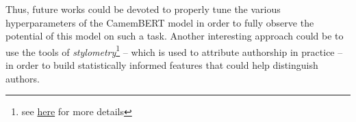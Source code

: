 \documentclass[11pt,a4paper]{article}
\begin{document}
Thus, future works could be devoted to properly tune the various hyperparameters of the CamemBERT model in order to fully observe the potential of this model on such a task. Another interesting approach could be to use the tools of \textit{stylometry}\footnote{see \href{https://en.wikipedia.org/wiki/Stylometry}{here} for more details} -- which is used to attribute authorship in practice -- in order to build statistically informed features that could help distinguish authors.







\newpage



\end{document}
